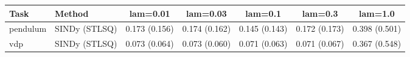 \begin{tabular}{llccccc}\toprule
Task & Method & lam=0.01 & lam=0.03 & lam=0.1 & lam=0.3 & lam=1.0 \\\midrule
pendulum & SINDy (STLSQ) & 0.173 (0.156) & 0.174 (0.162) & 0.145 (0.143) & 0.172 (0.173) & 0.398 (0.501) \\
vdp & SINDy (STLSQ) & 0.073 (0.064) & 0.073 (0.060) & 0.071 (0.063) & 0.071 (0.067) & 0.367 (0.548) \\
\bottomrule\end{tabular}
